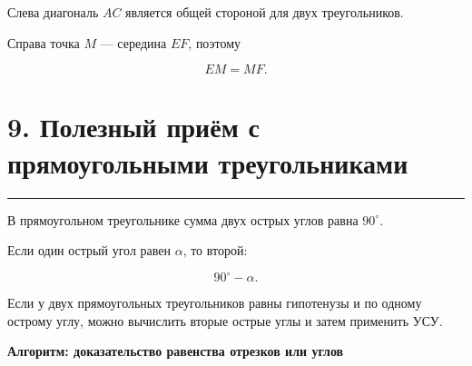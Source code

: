 \documentclass[a4paper,12pt]{article}
\newcommand{\sectionline}{
  \par
  \vspace{0.2em}
  \textcolor{lightline}{\rule{\linewidth}{0.8pt}}
  \par
  \vspace{0.35em}
}
\begin{document}
Слева диагональ $AC$ является общей стороной
для двух треугольников.

Справа точка $M$ --- середина $EF$, поэтому

\[
EM=MF.
\]


\section*{9. Полезный приём с прямоугольными треугольниками}
\sectionline

В прямоугольном треугольнике
сумма двух острых углов равна $90^\circ$.

Если один острый угол равен $\alpha$, то второй:

\[
90^\circ-\alpha.
\]

\begin{center}


\end{center}

Если у двух прямоугольных треугольников
равны гипотенузы и по одному острому углу,
можно вычислить вторые острые углы
и затем применить УСУ.


\clearpage

\thispagestyle{plain}

\begin{center}

{\Large
\textcolor{darkaccent}{
\textbf{
Алгоритм: доказательство равенства отрезков или углов
}
}
}

\end{center}
\end{document}

